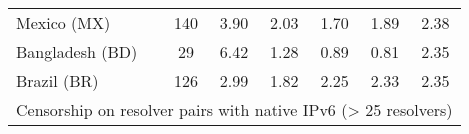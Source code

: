 \begin{table}[h!]
{\begin{tabular}{lcccccc}
Mexico (MX) & \color{black} 140 & {\cellcolor[HTML]{6AAED6}} \color[HTML]{F1F1F1} \color{black} 3.90 & {\cellcolor[HTML]{E8F1FA}} \color[HTML]{000000} \color{black} 2.03 & {\cellcolor[HTML]{F7FBFF}} \color[HTML]{000000} \color{black} 1.70 & {\cellcolor[HTML]{EEF5FC}} \color[HTML]{000000} \color{black} 1.89 & \color{black} 2.38 \\
Bangladesh (BD) & \color{black} 29 & {\cellcolor[HTML]{6AAED6}} \color[HTML]{F1F1F1} \color{black} 6.42 & {\cellcolor[HTML]{EFF6FC}} \color[HTML]{000000} \color{black} 1.28 & {\cellcolor[HTML]{F6FAFF}} \color[HTML]{000000} \color{black} 0.89 & {\cellcolor[HTML]{F7FBFF}} \color[HTML]{000000} \color{black} 0.81 & \color{black} 2.35 \\
Brazil (BR) & \color{black} 126 & {\cellcolor[HTML]{6AAED6}} \color[HTML]{F1F1F1} \color{black} 2.99 & {\cellcolor[HTML]{F7FBFF}} \color[HTML]{000000} \color{black} 1.82 & {\cellcolor[HTML]{D3E3F3}} \color[HTML]{000000} \color{black} 2.25 & {\cellcolor[HTML]{CDDFF1}} \color[HTML]{000000} \color{black} 2.33 & \color{black} 2.35 \\

    \midrule
    \multicolumn{7}{c}{Censorship on resolver pairs with native IPv6 (> 25
    resolvers)}\\
    \midrule


\end{tabular}}
\end{table}
